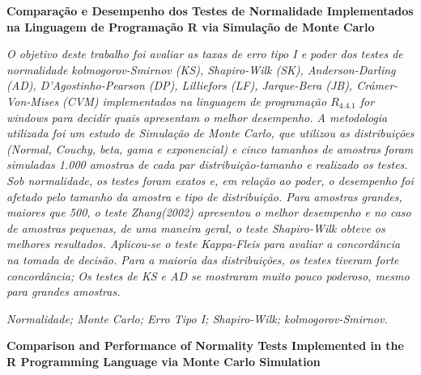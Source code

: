 \documentclass[a4paper,11pt]{article} %
\begin{document}
\pagestyle{fancy}
\setcounter{page}{1}
\renewcommand{\thefootnote}{$\dagger$}
\lfoot{}
\rfoot{}

\begin{center}
    {\large {\bf Comparação e Desempenho dos Testes de Normalidade Implementados na Linguagem de Programação R via Simulação de Monte Carlo}}\vspace{0.3cm}
\end{center}

\begin{small}

 {\it 
    O objetivo deste trabalho foi avaliar as taxas de erro tipo I e poder dos testes de normalidade kolmogorov-Smirnov (KS), Shapiro-Wilk (SK), Anderson-Darling (AD), D’Agostinho-Pearson (DP), Lilliefors (LF), Jarque-Bera (JB), Crámer-Von-Mises (CVM) implementados na linguagem de programação $R_{4.4.1}$ for windows para decidir quais apresentam o melhor desempenho. A metodologia utilizada foi um estudo de Simulação de Monte Carlo, que utilizou as distribuições (Normal, Couchy, beta, gama e exponencial) e cinco tamanhos de amostras foram simuladas 1.000 amostras de cada par distribuição-tamanho e realizado os testes. Sob normalidade, os testes foram exatos e, em relação ao poder, o desempenho foi afetado pelo tamanho da amostra e tipo de distribuição. Para amostras grandes, maiores que 500, o teste \textit{Zhang(2002)} apresentou o melhor desempenho e no caso de amostras pequenas, de uma maneira geral, o teste Shapiro-Wilk obteve os melhores resultados. Aplicou-se o teste Kappa-Fleis para avaliar a concordância na tomada de decisão. Para a maioria das distribuições, os testes tiveram forte concordância; Os testes de KS e AD se mostraram muito pouco poderoso, mesmo para grandes amostras.}\vspace{0.3cm}

 {\it Normalidade; Monte Carlo; Erro Tipo I; Shapiro-Wilk; kolmogorov-Smirnov.}\vspace{0.3cm}

\end{small}

\begin{center}
    {\large {\bf Comparison and Performance of Normality Tests Implemented in the R Programming Language via Monte Carlo Simulation}\vspace{0.3cm}}
\end{center}
\end{document}
